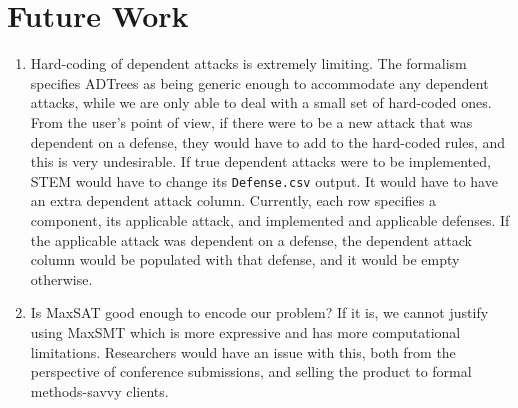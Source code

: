 \documentclass{article}
\begin{document}
\section{Future Work}
	\begin{enumerate}
		\item Hard-coding of dependent attacks is 
		extremely limiting. The formalism specifies 
		ADTrees as being generic enough to accommodate 
		any dependent attacks, while we are only able
		to deal with a small set of hard-coded 
		ones. From the user's point of view, if 
		there were to be a new attack that was 
		dependent on a defense, they would have to
		add to the hard-coded rules, and this is 
		very undesirable. If true dependent
		attacks were to be implemented, STEM 
		would have to change its \texttt{Defense.csv}
		output. It would have to have an extra 
		dependent attack column. Currently, each 
		row specifies a component, its applicable
		attack, and implemented and applicable 
		defenses. If the applicable attack was 
		dependent on a defense, the dependent 
		attack column would be populated with
		that defense, and it would be empty
		otherwise.
		\item Is MaxSAT good enough to encode our 
		problem? If it is, we cannot justify using 
		MaxSMT which is more expressive and has 
		more computational limitations. Researchers
		would have an issue with this, both from 
		the perspective of conference submissions, 
		and selling the product to formal 
		methods-savvy clients.
	\end{enumerate}
\end{document}
